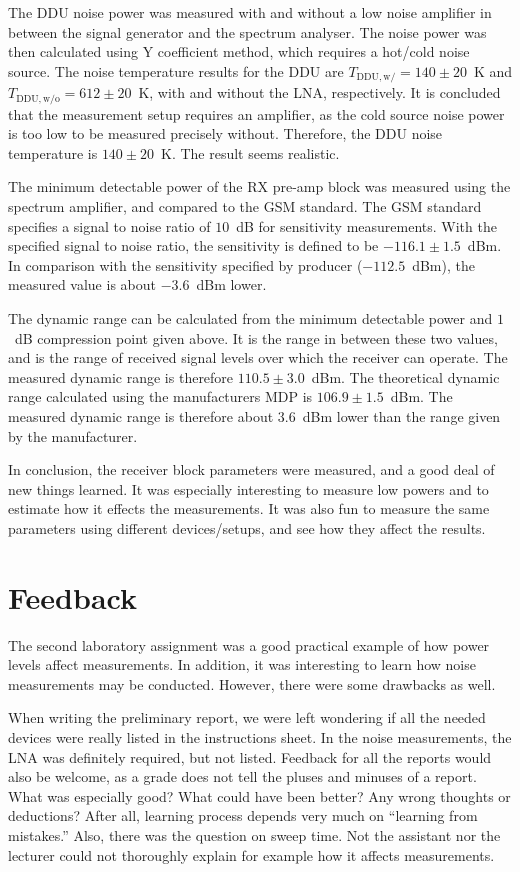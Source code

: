 \documentclass[a4paper, 12pt]{article}
\begin{document}
The DDU noise power was measured with and without a low noise amplifier in between the signal 
generator and the spectrum analyser. The noise power was then calculated using Y coefficient
 method, which requires a hot/cold noise source. The noise temperature results for the DDU are 
 $T_\mathrm{DDU, w/} = 140 \pm 20$~K and $T_\mathrm{DDU, w/o} = 612 \pm 20$~K, with and without the 
 LNA, respectively. It is concluded that the measurement setup requires an amplifier, as the 
 cold source noise power is too low to be measured precisely without. Therefore, the DDU noise 
 temperature is $140 \pm 20$~K. The result seems realistic.

The minimum detectable power of the RX pre-amp block was measured using the spectrum amplifier, 
and compared to the GSM standard. The GSM standard specifies a signal to noise ratio of $10$~dB 
for sensitivity measurements. With the specified signal to noise ratio, the sensitivity is 
defined to be $-116.1 \pm 1.5$~dBm. In comparison with the sensitivity specified by producer 
($-112.5$~dBm), the measured value is about $-3.6$~dBm lower.

The dynamic range can be calculated from the minimum detectable power and $1$~dB compression 
point given above. It is the range in between these two values, and is the range of received 
signal levels over which the receiver can operate. The measured dynamic range is therefore 
$110.5 \pm 3.0$~dBm. The theoretical dynamic range calculated using the manufacturers MDP is 
$106.9 \pm 1.5$~dBm. The measured dynamic range is therefore about $3.6$~dBm lower than the 
range given by the manufacturer.

In conclusion, the receiver block parameters were measured, and a good deal of new things 
learned. It was especially interesting to measure low powers and to estimate how it effects 
the measurements. It was also fun to measure the same parameters using different devices/setups, 
and see how they affect the results.

\newpage
\section{Feedback}

The second laboratory assignment was a good practical example of how power levels affect 
measurements. In addition, it was interesting to learn how noise measurements may be conducted. 
However, there were some drawbacks as well.

When writing the preliminary report, we were left wondering if all the needed devices were 
really listed in the instructions sheet. In the noise measurements, the LNA was definitely 
required, but not listed. Feedback for all the reports would also be welcome, as a grade 
does not tell the pluses and minuses of a report. What was especially good? What could have 
been better? Any wrong thoughts or deductions? After all, learning process depends very much 
on ``learning from mistakes.'' Also, there was the question on sweep time. Not the assistant 
nor the lecturer could not thoroughly explain for example how it affects measurements.
\end{document}
